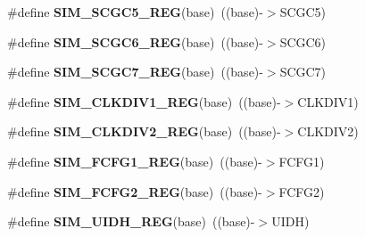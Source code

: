 \begin{DoxyCompactItemize}
\item 
\#define {\bfseries S\+I\+M\+\_\+\+S\+C\+G\+C5\+\_\+\+R\+EG}(base)~((base)-\/$>$S\+C\+G\+C5)\hypertarget{group__SIM__Register__Accessor__Macros_gacbcf62e33427e5aabbfe947adf619d25}{}\label{group__SIM__Register__Accessor__Macros_gacbcf62e33427e5aabbfe947adf619d25}

\item 
\#define {\bfseries S\+I\+M\+\_\+\+S\+C\+G\+C6\+\_\+\+R\+EG}(base)~((base)-\/$>$S\+C\+G\+C6)\hypertarget{group__SIM__Register__Accessor__Macros_ga575def69d6a2257a1b2014c3c2fcae54}{}\label{group__SIM__Register__Accessor__Macros_ga575def69d6a2257a1b2014c3c2fcae54}

\item 
\#define {\bfseries S\+I\+M\+\_\+\+S\+C\+G\+C7\+\_\+\+R\+EG}(base)~((base)-\/$>$S\+C\+G\+C7)\hypertarget{group__SIM__Register__Accessor__Macros_gace178bd787df5cdde63669fb795a84d5}{}\label{group__SIM__Register__Accessor__Macros_gace178bd787df5cdde63669fb795a84d5}

\item 
\#define {\bfseries S\+I\+M\+\_\+\+C\+L\+K\+D\+I\+V1\+\_\+\+R\+EG}(base)~((base)-\/$>$C\+L\+K\+D\+I\+V1)\hypertarget{group__SIM__Register__Accessor__Macros_gaa05276138d6ba426d9977f62fa12d659}{}\label{group__SIM__Register__Accessor__Macros_gaa05276138d6ba426d9977f62fa12d659}

\item 
\#define {\bfseries S\+I\+M\+\_\+\+C\+L\+K\+D\+I\+V2\+\_\+\+R\+EG}(base)~((base)-\/$>$C\+L\+K\+D\+I\+V2)\hypertarget{group__SIM__Register__Accessor__Macros_ga3042199ec3bde281552071431b9adf41}{}\label{group__SIM__Register__Accessor__Macros_ga3042199ec3bde281552071431b9adf41}

\item 
\#define {\bfseries S\+I\+M\+\_\+\+F\+C\+F\+G1\+\_\+\+R\+EG}(base)~((base)-\/$>$F\+C\+F\+G1)\hypertarget{group__SIM__Register__Accessor__Macros_gaa218fdd61f5d04088d7fa1cbec4ba9a9}{}\label{group__SIM__Register__Accessor__Macros_gaa218fdd61f5d04088d7fa1cbec4ba9a9}

\item 
\#define {\bfseries S\+I\+M\+\_\+\+F\+C\+F\+G2\+\_\+\+R\+EG}(base)~((base)-\/$>$F\+C\+F\+G2)\hypertarget{group__SIM__Register__Accessor__Macros_ga28d588cd36812f942a01c0ee0ad1beb0}{}\label{group__SIM__Register__Accessor__Macros_ga28d588cd36812f942a01c0ee0ad1beb0}

\item 
\#define {\bfseries S\+I\+M\+\_\+\+U\+I\+D\+H\+\_\+\+R\+EG}(base)~((base)-\/$>$U\+I\+DH)\hypertarget{group__SIM__Register__Accessor__Macros_gacb530eb0afb199280e2d3d1aec55b0dc}{}\label{group__SIM__Register__Accessor__Macros_gacb530eb0afb199280e2d3d1aec55b0dc}


\end{DoxyCompactItemize}
